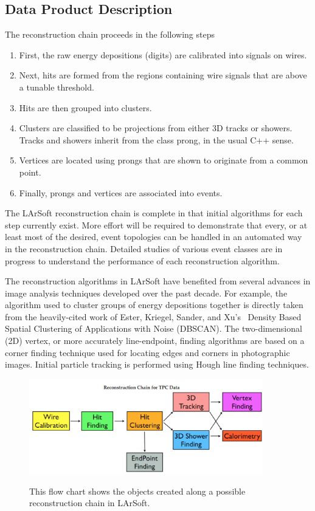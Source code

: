 \documentclass[12pt]{elsarticle}
\begin{document}
\subsection{Data Product Description}
The reconstruction chain proceeds in the following steps
\begin{enumerate}
\item First, the raw energy depositions (digits) are calibrated into signals on wires.
\item Next, hits are formed from the regions containing wire signals that are above a tunable threshold.
\item Hits are then grouped into clusters.
\item Clusters are classified to be projections from either 3D tracks or showers. Tracks and showers inherit from the class prong, in the usual C++ sense.
\item Vertices are located using prongs that are shown to originate from a common point.
\item Finally, prongs and vertices are associated into events.
\end{enumerate}
The LArSoft reconstruction chain is complete in that initial algorithms for each step currently exist.  More effort will be required to demonstrate that every, or at least most of the desired, event topologies can be handled in an automated way in the reconstruction chain. Detailed studies of various event classes are in progress to understand the performance of each reconstruction algorithm.

The reconstruction algorithms in LArSoft have benefited from several advances in image analysis techniques developed over the past decade.  For example, the algorithm used to cluster groups of energy depositions together is directly taken from the heavily-cited work of Ester, Kriegel, Sander, and Xu's~\cite{ester} Density Based Spatial Clustering of Applications with Noise (DBSCAN). The two-dimensional (2D) vertex, or more accurately line-endpoint, finding algorithms are based on a corner finding technique used for locating edges and corners in photographic images.  Initial particle tracking is performed using Hough line finding techniques.

\hspace*{2cm}
\begin{figure}[h]
\centering
\caption{This flow chart shows the objects created along a possible reconstruction chain in LArSoft.}
\includegraphics[width=4.0in]{./mtrls/imgs/LArSoft-Recon-Flow-Soderberg.png}
\label{flow}
\end{figure}
\end{document}
